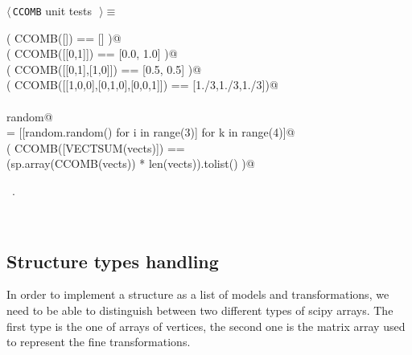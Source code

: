 \documentclass[11pt,oneside]{article}	%
\begin{document}
\begin{flushleft} \small
\begin{minipage}{\linewidth} \label{scrap21}
$\langle\,$\texttt{CCOMB} unit tests\nobreak\ {\footnotesize {}}$\,\rangle\equiv$
\vspace{-1ex}
\begin{list}{}{} \item
\mbox{}\verb@assert( CCOMB([]) == [] )@\\
\mbox{}\verb@assert( CCOMB([[0,1]]) == [0.0, 1.0] )@\\
\mbox{}\verb@assert( CCOMB([[0,1],[1,0]]) == [0.5, 0.5] )@\\
\mbox{}\verb@assert( CCOMB([[1,0,0],[0,1,0],[0,0,1]]) == [1./3,1./3,1./3])@\\
\mbox{}\verb@@\\
\mbox{}\verb@import random@\\
\mbox{}\verb@vects = [[random.random() for i in range(3)] for k in range(4)]@\\
\mbox{}\verb@assert( CCOMB([VECTSUM(vects)]) == \@\\
\mbox{}\verb@        (sp.array(CCOMB(vects)) * len(vects)).tolist() )@\\
\mbox{}\verb@@{\NWsep}
\end{list}
\vspace{-1ex}
\footnotesize\addtolength{\baselineskip}{-1ex}
\begin{list}{}{\setlength{\itemsep}{-\parsep}\setlength{\itemindent}{-\leftmargin}}
\item \NWtxtMacroRefIn\ .
\end{list}
\end{minipage}\\[4ex]
\end{flushleft}





\subsection{Structure types handling}

In order to implement a structure as a list of models and transformations, we need to be able to distinguish between two different types of scipy arrays. The first type is the one of arrays of vertices, the second one is the matrix array used to represent the fine transformations.
\end{document}

